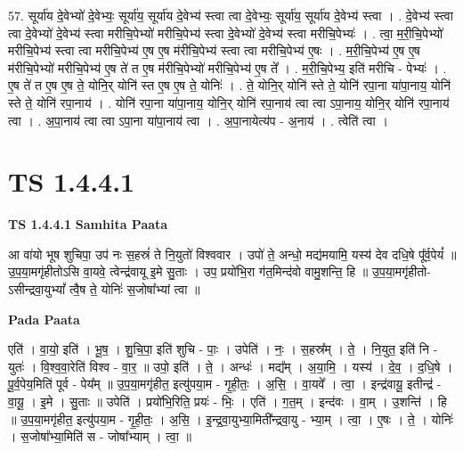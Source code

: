 \documentclass[17pt]{extarticle}
\begin{document}
57. सूर्या॑य दे॒वेभ्यो॑ दे॒वेभ्यः॒ सूर्या॑य॒ सूर्या॑य दे॒वेभ्य॑ स्त्वा त्वा दे॒वेभ्यः॒ सूर्या॑य॒ सूर्या॑य दे॒वेभ्य॑ स्त्वा । . दे॒वेभ्य॑ स्त्वा त्वा दे॒वेभ्यो॑ दे॒वेभ्य॑ स्त्वा मरीचि॒पेभ्यो॑ मरीचि॒पेभ्य॑ स्त्वा दे॒वेभ्यो॑ दे॒वेभ्य॑ स्त्वा मरीचि॒पेभ्यः॑ । . त्वा॒ म॒री॒चि॒पेभ्यो॑ मरीचि॒पेभ्य॑ स्त्वा त्वा मरीचि॒पेभ्य॑ ए॒ष ए॒ष म॑रीचि॒पेभ्य॑ स्त्वा त्वा मरीचि॒पेभ्य॑ ए॒षः । . म॒री॒चि॒पेभ्य॑ ए॒ष ए॒ष म॑रीचि॒पेभ्यो॑ मरीचि॒पेभ्य॑ ए॒ष ते॑ त ए॒ष म॑रीचि॒पेभ्यो॑ मरीचि॒पेभ्य॑ ए॒ष ते᳚ । . म॒री॒चि॒पेभ्य॒ इति॑ मरीचि - पेभ्यः॑ । . ए॒ष ते॑ त ए॒ष ए॒ष ते॒ योनि॒र् योनि॑ स्त ए॒ष ए॒ष ते॒ योनिः॑ । . ते॒ योनि॒र् योनि॑ स्ते ते॒ योनि॑ रपा॒ना या॑पा॒नाय॒ योनि॑ स्ते ते॒ योनि॑ रपा॒नाय॑ । . योनि॑ रपा॒ना या॑पा॒नाय॒ योनि॒र् योनि॑ रपा॒नाय॑ त्वा त्वा ऽपा॒नाय॒ योनि॒र् योनि॑ रपा॒नाय॑ त्वा । . अ॒पा॒नाय॑ त्वा त्वा ऽपा॒ना या॑पा॒नाय॑ त्वा । . अ॒पा॒नायेत्य॑प - अ॒नाय॑ । . त्वेति॑ त्वा । \newline
\pagebreak
{}
\section*{ TS 1.4.4.1 }

\textbf{TS 1.4.4.1 } \newline
\textbf{Samhita Paata} \newline

आ वा॑यो भूष शुचिपा॒ उप॑ नः स॒हस्रं॑ ते नि॒युतो॑ विश्ववार । उपो॑ ते॒ अन्धो॒ मद्य॑मयामि॒ यस्य॑ देव दधि॒षे पू᳚र्व॒पेयं᳚ ॥ उ॒प॒या॒मगृ॑हीतोऽसि वा॒यवे॒ त्वेन्द्र॑वायू इ॒मे सु॒ताः । उप॒ प्रयो॑भि॒रा ग॑त॒मिन्द॑वो वामु॒शन्ति॒ हि ॥ उ॒प॒या॒मगृ॑हीतो-ऽसीन्द्रवा॒युभ्यां᳚ त्वै॒ष ते॒ योनिः॑ स॒जोषा᳚भ्यां त्वा ॥ \newline

\textbf{Pada Paata} \newline

एति॑ । वा॒यो॒ इति॑ । भू॒ष॒ । शु॒चि॒पा॒ इति॑ शुचि - पाः॒ । उपेति॑ । नः॒ । स॒हस्र᳚म् । ते॒ । नि॒युत॒ इति॑ नि - युतः॑ । वि॒श्व॒वा॒रेति॑ विश्व - वा॒र॒ ॥ उपो॒ इति॑ । ते॒ । अन्धः॑ । मद्य᳚म् । अ॒या॒मि॒ । यस्य॑ । दे॒व॒ । द॒धि॒षे । पू॒र्व॒पेय॒मिति॑ पूर्व - पेय᳚म् ॥ उ॒प॒या॒मगृ॑हीत॒ इत्यु॑पया॒म - गृ॒ही॒तः॒ । अ॒सि॒ । वा॒यवे᳚ । त्वा॒ । इन्द्र॑वायू॒ इतीन्द्र॑ - वा॒यू॒ । इ॒मे । सु॒ताः ॥ उपेति॑ । प्रयो॑भि॒रिति॒ प्रयः॑ - भिः॒ । एति॑ । ग॒त॒म् । इन्द॑वः । वा॒म् । उ॒शन्ति॑ । हि ॥ उ॒प॒या॒मगृ॑हीत॒ इत्यु॑पया॒म - गृ॒ही॒तः॒ । अ॒सि॒ । इ॒न्द्र॒वा॒युभ्या॒मिती᳚न्द्रवा॒यु - भ्या॒म् । त्वा॒ । ए॒षः । ते॒ । योनिः॑ । स॒जोषा᳚भ्या॒मिति॑ स - जोषा᳚भ्याम् । त्वा॒ ॥  \newline
\end{document}
